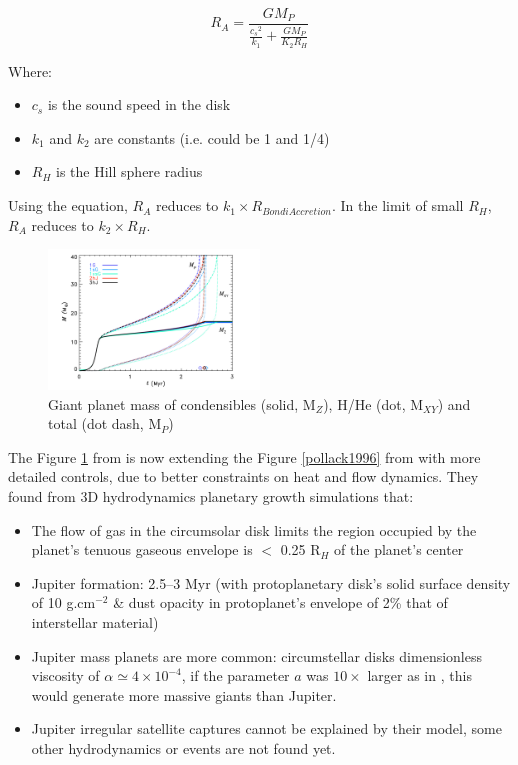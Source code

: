 \documentclass[12pt]{article} %
\begin{document}
\begin{equation}
R_A = \frac {GM_P} {\frac {c_s{^2}}{k_1}+\frac{GM_P}{K_2 R_H}}
\label{accretionlissauer}
\end{equation}
\smallskip

Where:
\begin{itemize}
\setlength\itemsep{0em}
\item $c_s$ is the sound speed in the disk
\item $k_1$ and $k_2$ are constants (i.e. could be 1 and 1/4)
\item $R_H$ is the Hill sphere radius
\end{itemize}
 Using the equation, $R_A$ reduces to $k_1 \times R_{Bondi Accretion}$. In the limit of small $R_H$, $R_A$ reduces to $k_2 \times R_H$.\newline

\begin{figure}
\begin{center}
 \includegraphics[width=0.5\textwidth,keepaspectratio=true]{./images/lissauer2014}
 \caption{Giant planet mass of condensibles (solid, M$_Z$), H/He (dot, M$_{XY}$) and total (dot dash, M$_P$)  \cite{lissauer2009models}}
 \label{lissauer2014}
\end{center}
\end{figure}


\noindent The Figure \ref{lissauer2014}  from \cite{lissauer2009models} is now extending the Figure \ref{pollack1996} from \cite{pollack1996formation}  with more detailed controls, due to better constraints on heat and flow dynamics. They found from 3D hydrodynamics planetary growth simulations that: 

\begin{itemize}
\setlength\itemsep{0em}
\item  The flow of gas in the circumsolar disk limits the region occupied by the planet’s tenuous gaseous envelope is $<$ 0.25 R$_H$ of the planet’s center
 \item Jupiter formation: 2.5–3 Myr (with protoplanetary disk's solid surface density of 10 g.cm$^{-2}$ \& dust opacity in protoplanet’s envelope of 2\% that of interstellar material)
\item Jupiter mass planets are more common: circumstellar disks dimensionless viscosity of $\alpha \simeq 4 \times 10 ^{-4}$, if the parameter $a$ was $10 \times$ larger as in \cite{bate2003three}, this would generate more massive giants than Jupiter.
\item Jupiter irregular satellite captures cannot be explained by their model, some other hydrodynamics or events are not found yet. 
\end{itemize}
\end{document}
